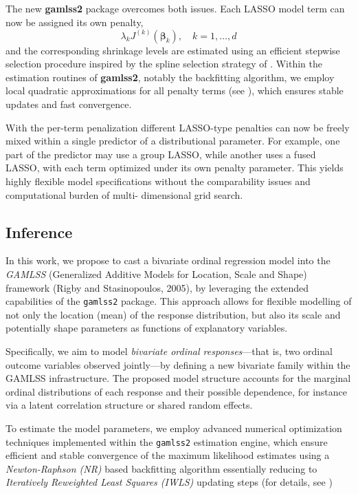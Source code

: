 \documentclass[submit]{smj}
\begin{document}
The new \textbf{gamlss2} package \citep{gamlss2:R} overcomes both issues. Each LASSO model term can now be assigned its own penalty,
$$
\lambda_{k} J^{(k)}(\boldsymbol{\beta}_k), \quad k = 1, \ldots, d
$$
and the corresponding shrinkage levels are estimated using an efficient stepwise selection 
procedure inspired by the spline selection strategy of \citet{bamlss:jcgs}. Within the 
estimation routines of \textbf{gamlss2}, notably the backfitting algorithm, we employ local 
quadratic approximations for all penalty terms (see \citealp{OelTutz:2017}), which ensures 
stable updates and fast convergence.

With the per-term penalization different LASSO-type penalties can now 
be freely mixed within a single predictor of a distributional parameter. For example, one 
part of the predictor may use a group LASSO, while another uses a fused LASSO, with each 
term optimized under its own penalty parameter. This yields highly flexible model 
specifications without the comparability issues and computational burden of multi-
dimensional grid search.

\subsection{Inference}\label{subsec:inference}

In this work, we propose to cast a bivariate ordinal regression model into the \textit{GAMLSS} (Generalized Additive Models for Location, Scale and Shape) framework (Rigby and Stasinopoulos, 2005), by leveraging the extended capabilities of the \texttt{gamlss2} package. This approach allows for flexible modelling of not only the location (mean) of the response distribution, but also its scale and potentially shape parameters as functions of explanatory variables.

Specifically, we aim to model \textit{bivariate ordinal responses}---that is, two ordinal outcome variables observed jointly---by defining a new bivariate family within the GAMLSS infrastructure. The proposed model structure accounts for the marginal ordinal distributions of each response and their possible dependence, for instance via a latent correlation structure or shared random effects.

To estimate the model parameters, we employ advanced numerical optimization techniques implemented within the \texttt{gamlss2} estimation engine, which ensure efficient and stable convergence of the maximum likelihood estimates using a \textit{Newton-Raphson (NR)} based backfitting algorithm essentially reducing to \textit{Iteratively Reweighted Least Squares (IWLS)} updating steps (for details, see \citealp{bamlss:jcgs})
\end{document}
